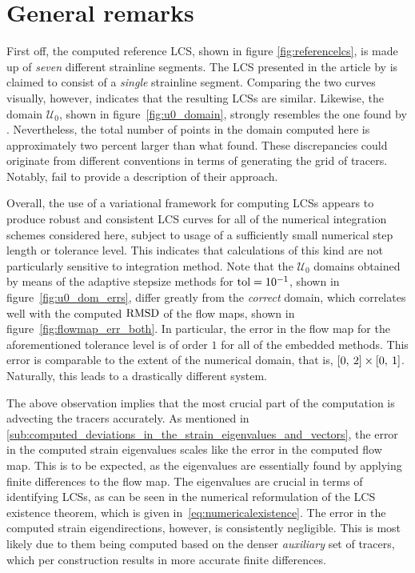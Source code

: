 \section{General remarks}
\label{sec:general_remarks}

First off, the computed reference LCS, shown in figure
\ref{fig:referencelcs}, is made up of \emph{seven} different strainline segments.
The LCS presented in the article by \textcite{farazmand2012computing} is claimed
to consist of a \emph{single} strainline segment. Comparing the two curves
visually, however, indicates that the resulting LCSs are similar. Likewise, the
domain $\mathcal{U}_{0}$, shown in figure~\ref{fig:u0_domain}, strongly
resembles the one found by \citeauthor{farazmand2012computing}. Nevertheless,
the total number of points in the domain computed here is approximately two
percent larger than what \citeauthor{farazmand2012computing} found. These
discrepancies could originate from different conventions in terms of generating
the grid of tracers. Notably, \citeauthor{farazmand2012computing} fail to
provide a description of their approach.

Overall, the use of a variational framework for computing LCSs appears to
produce robust and consistent LCS curves for all of the numerical integration
schemes considered here, subject to usage of a sufficiently small numerical
step length or tolerance level. This indicates that calculations of this kind
are not particularly sensitive to integration method. Note that the
$\mathcal{U}_{0}$ domains obtained by means of the adaptive stepsize methods
for $\textnormal{tol}=10^{-1}$, shown in figure~\ref{fig:u0_dom_errs}, differ
greatly from the \emph{correct} domain, which correlates well with the computed
$\operatorname{RMSD}$ of the flow maps, shown in figure~\ref{fig:flowmap_err_both}. In
particular, the error in the flow map for the aforementioned tolerance level is
of order $1$ for all of the embedded methods. This error is comparable to the
extent of the numerical domain, that is,
$[0,\hspace{0.5ex}2]\times[0,\hspace{0.5ex}1]$. Naturally, this leads to a
drastically different system.

The above observation implies that the most crucial part of the computation is
advecting the tracers accurately. As mentioned in
\cref{sub:computed_deviations_in_the_strain_eigenvalues_and_vectors}, the error
in the computed strain eigenvalues scales like the error in the computed flow
map. This is to be expected, as the eigenvalues are essentially found by
applying finite differences to the flow map. The eigenvalues are crucial in
terms of identifying LCSs, as can be seen in the numerical reformulation of the
LCS existence theorem, which is given in~\cref{eq:numericalexistence}.
The error in the computed strain eigendirections, however, is consistently
negligible. This is most likely due to them being computed based on the denser
\emph{auxiliary} set of tracers, which per construction results in more accurate
finite differences.

